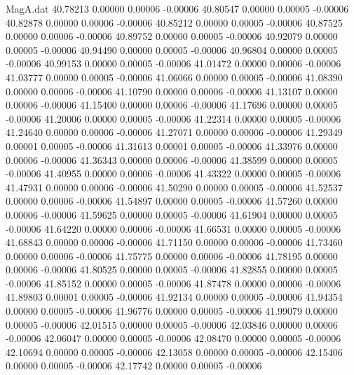 \begin{filecontents}{MagA.dat}
  40.78213    0.00000    0.00006   -0.00006
  40.80547    0.00000    0.00005   -0.00006
  40.82878    0.00000    0.00006   -0.00006
  40.85212    0.00000    0.00005   -0.00006
  40.87525    0.00000    0.00006   -0.00006
  40.89752    0.00000    0.00005   -0.00006
  40.92079    0.00000    0.00005   -0.00006
  40.94490    0.00000    0.00005   -0.00006
  40.96804    0.00000    0.00005   -0.00006
  40.99153    0.00000    0.00005   -0.00006
  41.01472    0.00000    0.00006   -0.00006
  41.03777    0.00000    0.00005   -0.00006
  41.06066    0.00000    0.00005   -0.00006
  41.08390    0.00000    0.00006   -0.00006
  41.10790    0.00000    0.00006   -0.00006
  41.13107    0.00000    0.00006   -0.00006
  41.15400    0.00000    0.00006   -0.00006
  41.17696    0.00000    0.00005   -0.00006
  41.20006    0.00000    0.00005   -0.00006
  41.22314    0.00000    0.00005   -0.00006
  41.24640    0.00000    0.00006   -0.00006
  41.27071    0.00000    0.00006   -0.00006
  41.29349    0.00001    0.00005   -0.00006
  41.31613    0.00001    0.00005   -0.00006
  41.33976    0.00000    0.00006   -0.00006
  41.36343    0.00000    0.00006   -0.00006
  41.38599    0.00000    0.00005   -0.00006
  41.40955    0.00000    0.00006   -0.00006
  41.43322    0.00000    0.00005   -0.00006
  41.47931    0.00000    0.00006   -0.00006
  41.50290    0.00000    0.00005   -0.00006
  41.52537    0.00000    0.00006   -0.00006
  41.54897    0.00000    0.00005   -0.00006
  41.57260    0.00000    0.00006   -0.00006
  41.59625    0.00000    0.00005   -0.00006
  41.61904    0.00000    0.00005   -0.00006
  41.64220    0.00000    0.00006   -0.00006
  41.66531    0.00000    0.00005   -0.00006
  41.68843    0.00000    0.00006   -0.00006
  41.71150    0.00000    0.00006   -0.00006
  41.73460    0.00000    0.00006   -0.00006
  41.75775    0.00000    0.00006   -0.00006
  41.78195    0.00000    0.00006   -0.00006
  41.80525    0.00000    0.00005   -0.00006
  41.82855    0.00000    0.00005   -0.00006
  41.85152    0.00000    0.00005   -0.00006
  41.87478    0.00000    0.00006   -0.00006
  41.89803    0.00001    0.00005   -0.00006
  41.92134    0.00000    0.00005   -0.00006
  41.94354    0.00000    0.00005   -0.00006
  41.96776    0.00000    0.00005   -0.00006
  41.99079    0.00000    0.00005   -0.00006
  42.01515    0.00000    0.00005   -0.00006
  42.03846    0.00000    0.00006   -0.00006
  42.06047    0.00000    0.00005   -0.00006
  42.08470    0.00000    0.00005   -0.00006
  42.10694    0.00000    0.00005   -0.00006
  42.13058    0.00000    0.00005   -0.00006
  42.15406    0.00000    0.00005   -0.00006
  42.17742    0.00000    0.00005   -0.00006

\end{filecontents}
